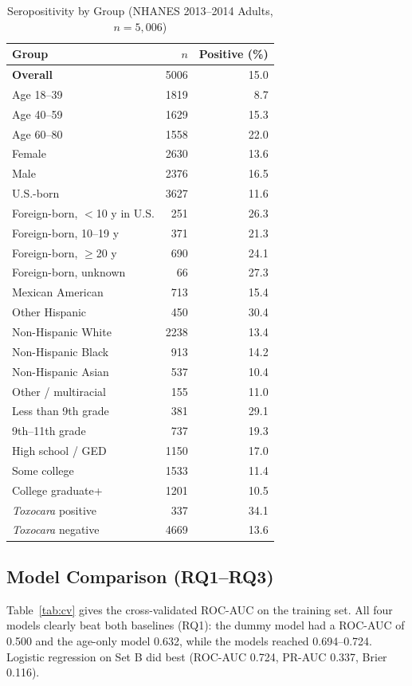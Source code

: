 \documentclass[conference]{IEEEtran}
\begin{document}
\begin{table}[t]
\caption{Seropositivity by Group (NHANES 2013--2014 Adults, $n=5{,}006$)}
\label{tab:cohort}
\centering
\small
\begin{tabular}{lrr}
\toprule
Group & $n$ & Positive (\%) \\
\midrule
\textbf{Overall} & 5006 & 15.0 \\
\midrule
Age 18--39 & 1819 & 8.7 \\
Age 40--59 & 1629 & 15.3 \\
Age 60--80 & 1558 & 22.0 \\
\midrule
Female & 2630 & 13.6 \\
Male & 2376 & 16.5 \\
\midrule
U.S.-born & 3627 & 11.6 \\
Foreign-born, $<$10 y in U.S. & 251 & 26.3 \\
Foreign-born, 10--19 y & 371 & 21.3 \\
Foreign-born, $\geq$20 y & 690 & 24.1 \\
Foreign-born, unknown & 66 & 27.3 \\
\midrule
Mexican American & 713 & 15.4 \\
Other Hispanic & 450 & 30.4 \\
Non-Hispanic White & 2238 & 13.4 \\
Non-Hispanic Black & 913 & 14.2 \\
Non-Hispanic Asian & 537 & 10.4 \\
Other / multiracial & 155 & 11.0 \\
\midrule
Less than 9th grade & 381 & 29.1 \\
9th--11th grade & 737 & 19.3 \\
High school / GED & 1150 & 17.0 \\
Some college & 1533 & 11.4 \\
College graduate+ & 1201 & 10.5 \\
\midrule
\textit{Toxocara} positive & 337 & 34.1 \\
\textit{Toxocara} negative & 4669 & 13.6 \\
\bottomrule
\end{tabular}
\end{table}

\subsection{Model Comparison (RQ1--RQ3)}
Table~\ref{tab:cv} gives the cross-validated ROC-AUC on the training set. All four models clearly beat both baselines (RQ1): the dummy model had a ROC-AUC of 0.500 and the age-only model 0.632, while the models reached 0.694--0.724. Logistic regression on Set B did best (ROC-AUC 0.724, PR-AUC 0.337, Brier 0.116).
\end{document}
